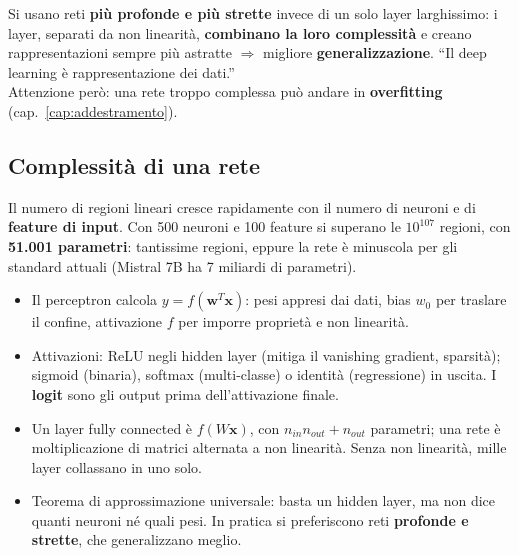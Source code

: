 \begin{esame}
Si usano reti \textbf{più profonde e più strette} invece di un solo layer larghissimo: i layer, separati da non linearità,
\textbf{combinano la loro complessità} e creano rappresentazioni sempre più astratte $\Rightarrow$ migliore
\textbf{generalizzazione}. ``Il deep learning è rappresentazione dei dati.''\\
Attenzione però: una rete troppo complessa può andare in \textbf{overfitting} (cap.~\ref{cap:addestramento}).
\end{esame}

\subsection{Complessità di una rete}
Il numero di regioni lineari cresce rapidamente con il numero di neuroni e di \textbf{feature di input}.
Con 500 neuroni e 100 feature si superano le $10^{107}$ regioni, con \textbf{51.001 parametri}: tantissime regioni, eppure
la rete è minuscola per gli standard attuali (Mistral 7B ha 7 miliardi di parametri).


\begin{sintesi}
\begin{itemize}
  \item Il perceptron calcola $y=f(\mathbf{w}^T\mathbf{x})$: pesi appresi dai dati, bias $w_0$ per traslare il confine,
        attivazione $f$ per imporre proprietà e non linearità.
  \item Attivazioni: ReLU negli hidden layer (mitiga il vanishing gradient, sparsità); sigmoid (binaria), softmax
        (multi-classe) o identità (regressione) in uscita. I \textbf{logit} sono gli output prima dell'attivazione finale.
  \item Un layer fully connected è $f(W\mathbf{x})$, con $n_{in}n_{out}+n_{out}$ parametri; una rete è moltiplicazione di
        matrici alternata a non linearità. Senza non linearità, mille layer collassano in uno solo.
  \item Teorema di approssimazione universale: basta un hidden layer, ma non dice quanti neuroni né quali pesi.
        In pratica si preferiscono reti \textbf{profonde e strette}, che generalizzano meglio.
\end{itemize}
\end{sintesi}
